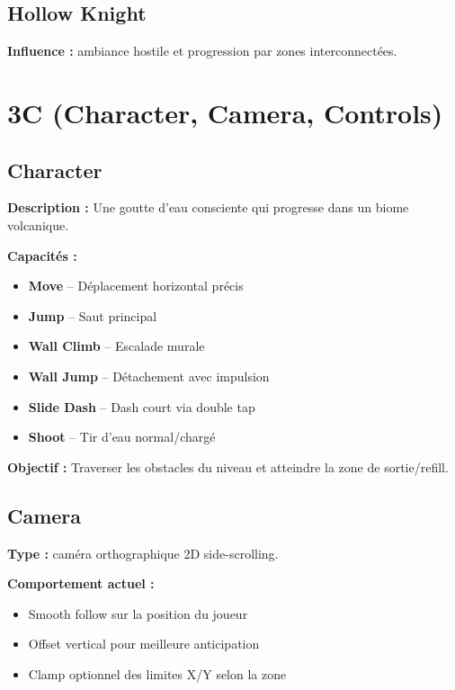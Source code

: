 ﻿\documentclass[12pt,a4paper]{article}
\begin{document}
\subsection{Hollow Knight}
\textbf{Influence :} ambiance hostile et progression par zones interconnectées.

\section{3C (Character, Camera, Controls)}

\subsection{Character}

\textbf{Description :} Une goutte d'eau consciente qui progresse dans un biome volcanique.

\textbf{Capacités :}
\begin{itemize}[noitemsep]
    \item \textbf{Move} -- Déplacement horizontal précis
    \item \textbf{Jump} -- Saut principal
    \item \textbf{Wall Climb} -- Escalade murale
    \item \textbf{Wall Jump} -- Détachement avec impulsion
    \item \textbf{Slide Dash} -- Dash court via double tap
    \item \textbf{Shoot} -- Tir d'eau normal/chargé
\end{itemize}

\textbf{Objectif :} Traverser les obstacles du niveau et atteindre la zone de sortie/refill.

\subsection{Camera}

\textbf{Type :} caméra orthographique 2D side-scrolling.

\textbf{Comportement actuel :}
\begin{itemize}[noitemsep]
    \item Smooth follow sur la position du joueur
    \item Offset vertical pour meilleure anticipation
    \item Clamp optionnel des limites X/Y selon la zone
\end{itemize}
\end{document}
